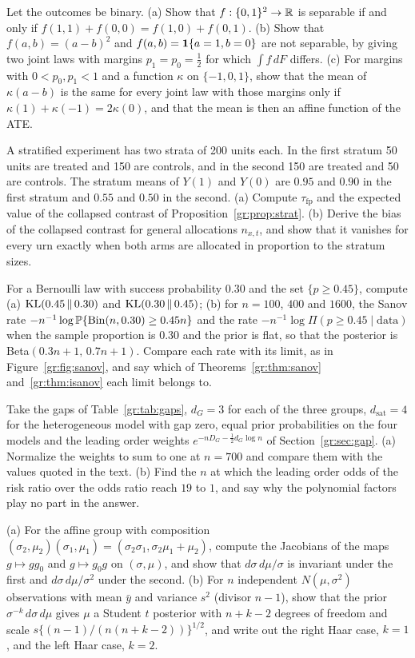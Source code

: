 \begin{exercises}
\item\label{ex:gr:5} Let the outcomes be binary. (a) Show that $f:\{0,1\}^2\to\mathbb{R}$ is separable if and only if $f(1,1)+f(0,0)=f(1,0)+f(0,1)$. (b) Show that $f(a,b)=(a-b)^2$ and $f(a,b)=\mathbf{1}\{a=1,b=0\}$ are not separable, by giving two joint laws with margins $p_1=p_0=\tfrac12$ for which $\int f\,dF$ differs. (c) For margins with $0<p_0,p_1<1$ and a function $\kappa$ on $\{-1,0,1\}$, show that the mean of $\kappa(a-b)$ is the same for every joint law with those margins only if $\kappa(1)+\kappa(-1)=2\kappa(0)$, and that the mean is then an affine function of the ATE.
\item\label{ex:gr:6} A stratified experiment has two strata of 200 units each. In the first stratum 50 units are treated and 150 are controls, and in the second 150 are treated and 50 are controls. The stratum means of $Y(1)$ and $Y(0)$ are $0.95$ and $0.90$ in the first stratum and $0.55$ and $0.50$ in the second. (a) Compute $\tau_{\mathrm{fp}}$ and the expected value of the collapsed contrast of Proposition~\ref{gr:prop:strat}. (b) Derive the bias of the collapsed contrast for general allocations $n_{x,t}$, and show that it vanishes for every urn exactly when both arms are allocated in proportion to the stratum sizes.
\item\label{ex:gr:7} For a Bernoulli law with success probability $0.30$ and the set $\{p\ge0.45\}$, compute (a) $\mathrm{KL}(0.45\,\|\,0.30)$ and $\mathrm{KL}(0.30\,\|\,0.45)$; (b) for $n=100$, $400$ and $1600$, the Sanov rate $-n^{-1}\log\mathbb{P}\{\mathrm{Bin}(n,0.30)\ge0.45n\}$ and the rate $-n^{-1}\log\Pi(p\ge0.45\mid\text{data})$ when the sample proportion is $0.30$ and the prior is flat, so that the posterior is Beta$(0.3n+1,\,0.7n+1)$. Compare each rate with its limit, as in Figure~\ref{gr:fig:sanov}, and say which of Theorems~\ref{gr:thm:sanov} and~\ref{gr:thm:isanov} each limit belongs to.
\item\label{ex:gr:8} Take the gaps of Table~\ref{gr:tab:gaps}, $d_G=3$ for each of the three groups, $d_{\mathrm{sat}}=4$ for the heterogeneous model with gap zero, equal prior probabilities on the four models and the leading order weights $e^{-nD_G-\frac12d_G\log n}$ of Section~\ref{gr:sec:gap}. (a) Normalize the weights to sum to one at $n=700$ and compare them with the values quoted in the text. (b) Find the $n$ at which the leading order odds of the risk ratio over the odds ratio reach $19$ to $1$, and say why the polynomial factors play no part in the answer.
\item\label{ex:gr:9} (a) For the affine group with composition $(\sigma_2,\mu_2)(\sigma_1,\mu_1)=(\sigma_2\sigma_1,\sigma_2\mu_1+\mu_2)$, compute the Jacobians of the maps $g\mapsto gg_0$ and $g\mapsto g_0g$ on $(\sigma,\mu)$, and show that $d\sigma\,d\mu/\sigma$ is invariant under the first and $d\sigma\,d\mu/\sigma^2$ under the second. (b) For $n$ independent $N(\mu,\sigma^2)$ observations with mean $\bar y$ and variance $s^2$ (divisor $n-1$), show that the prior $\sigma^{-k}\,d\sigma\,d\mu$ gives $\mu$ a Student $t$ posterior with $n+k-2$ degrees of freedom and scale $s\{(n-1)/(n(n+k-2))\}^{1/2}$, and write out the right Haar case, $k=1$, and the left Haar case, $k=2$.

\end{exercises}
